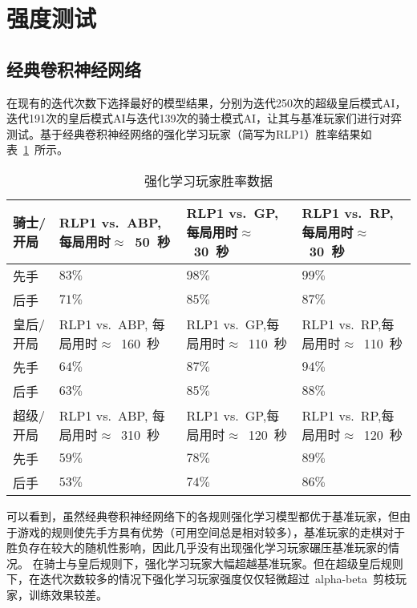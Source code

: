\section{强度测试}

\subsection{经典卷积神经网络}
在现有的迭代次数下选择最好的模型结果，分别为迭代250次的超级皇后模式AI，迭代191次的皇后模式AI与迭代139次的骑士模式AI，让其与基准玩家们进行对弈测试。基于经典卷积神经网络的强化学习玩家（简写为RLP1）胜率结果如表~\ref{table:airesult}~所示。
\begin{table}[H]
    \centering
    \caption[airesult]{强化学习玩家胜率数据}
    \begin{tabular}{p{2cm}<{\centering} p{4cm}<{\centering} p{4cm}<{\centering} p{4cm}<{\centering}}
    \hline
    骑士/开局 & RLP1 vs.\  ABP, 每局用时$\approx$~50~秒 & RLP1 vs.\  GP,每局用时$\approx$~30~秒 & RLP1 vs.\  RP,每局用时$\approx$~30~秒 \\ \hline
    先手 & $83\%$ & $98\%$ & $99\%$\\ 
    后手 & $71\%$ & $85\%$ & $87\%$\\ \hline
    皇后/开局 & RLP1 vs.\  ABP, 每局用时$\approx$~160~秒 & RLP1 vs.\  GP,每局用时$\approx$~110~秒 & RLP1 vs.\  RP,每局用时$\approx$~110~秒 \\ \hline
    先手 & $64\%$ & $87\%$ & $94\%$\\ 
    后手 & $63\%$ & $85\%$ & $88\%$\\ \hline
    超级/开局 & RLP1 vs.\  ABP, 每局用时$\approx$~310~秒 & RLP1 vs.\  GP,每局用时$\approx$~120~秒 & RLP1 vs.\  RP,每局用时$\approx$~120~秒 \\ \hline
    先手 & $59\%$ & $78\%$ & $89\%$\\ 
    后手 & $53\%$ & $74\%$ & $86\%$\\ \hline
    \end{tabular}
    \label{table:airesult}
  \end{table}
可以看到，虽然经典卷积神经网络下的各规则强化学习模型都优于基准玩家，但由于游戏的规则使先手方具有优势（可用空间总是相对较多），基准玩家的走棋对于胜负存在较大的随机性影响，因此几乎没有出现强化学习玩家碾压基准玩家的情况。
在骑士与皇后规则下，强化学习玩家大幅超越基准玩家。但在超级皇后规则下，在迭代次数较多的情况下强化学习玩家强度仅仅轻微超过~alpha-beta~剪枝玩家，训练效果较差。
